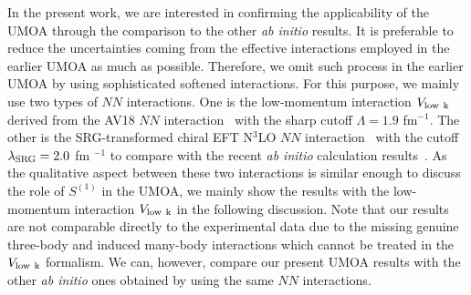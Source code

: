 \documentclass[aps,prc, dvips, twocolumn,groupedaddress,showkeys,showpacs,floatfix,superscriptaddress]{revtex4-1}
\newcommand{\<}{\langle}
\renewcommand{\>}{\rangle}
\begin{document}
In the present work, we are interested in confirming the applicability
 of the UMOA through the comparison to the other {\it ab initio} results.
It is preferable to reduce the uncertainties coming from the effective interactions
employed in the earlier UMOA as much as possible.
Therefore, we omit such process in the earlier UMOA by using sophisticated softened interactions.
For this purpose, we mainly use two types of $NN$ interactions.
One is the low-momentum interaction
 $V_{{\rm low \ k}}$ derived from the AV18 $NN$ interaction~\cite{Wiringa:1995} with the sharp cutoff $\Lambda = 1.9$ fm$^{-1}$.
The other is the SRG-transformed chiral EFT N$^{3}$LO $NN$ interaction~\cite{Entem:2003} with the cutoff
  $\lambda_{\rm SRG} = 2.0$ fm $^{-1}$
 to compare with the recent {\em ab initio} calculation results~\cite{Nogga:2004, Hagen:2007, Roth:2011}.
 As the qualitative aspect between these two interactions is similar enough to discuss the role of $S^{(1)}$ in the UMOA,
 we mainly show the results with the low-momentum interaction $V_{{\rm low \ k}}$ in the following discussion.
 Note that our results are not comparable directly to the experimental data
due to the missing genuine three-body and induced many-body interactions
which cannot be treated in the $V_{\rm low \ k}$ formalism.
We can, however, compare our present UMOA results with the other {\it ab initio} ones
obtained by using the same $NN$ interactions.

\end{document}
